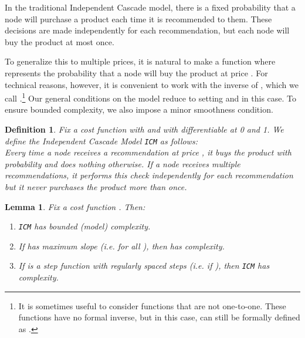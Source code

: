 \documentclass[letterpaper,twoside]{article}
\newtheorem{lemma}{Lemma}
\newtheorem{defn}{Definition}
\newcommand{\ICM}[1]{\texttt{ICM}}
\begin{document}
In the traditional Independent Cascade model, there is a fixed
probability  that a node will purchase a product each time it is
recommended to them. These decisions are made independently for each
recommendation, but each node will buy the product at most once.

To generalize this to multiple prices, it is natural to make  a
function  where  represents the
probability that a node will buy the product at price . For
technical reasons, however, it is convenient to work with the
inverse of , which we call .\footnote{It is sometimes useful
to consider functions  that are not one-to-one. These functions have
no formal inverse, but in this case,  can still be formally defined as
.} Our general conditions on the
model reduce to setting  and  in this case. To ensure
bounded complexity, we also impose a minor smoothness condition.
\begin{defn}
    Fix a cost function  with
     and with  differentiable at 0 and 1.
    We define the {\em Independent Cascade Model} \ICM{c} as follows:\\
    Every time a node receives a recommendation at price , it
    buys the product with probability  and does nothing
    otherwise. If a node receives multiple recommendations, it
    performs this check independently for each recommendation but
    it never purchases the product more than once.
\end{defn}

\begin{lemma} \label{ICMLem}
    Fix a cost function . Then:
    \begin{enumerate}
      \item \ICM{C} has bounded (model) complexity.
      \item If  has maximum slope  (i.e.
         for all ), then  has 
        complexity.
      \item If  is a step function with  regularly spaced
            steps (i.e.  if ), then \ICM{C}
            has  complexity.
    \end{enumerate}
\end{lemma}
\end{document}
